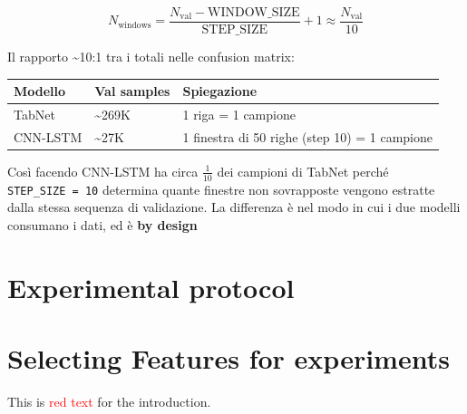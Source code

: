 \[N_{\text{windows}} = \frac{N_{\text{val}} - \text{WINDOW\_SIZE}}{\text{STEP\_SIZE}} + 1 \approx \frac{N_{\text{val}}}{10}\]

Il rapporto \textasciitilde10:1 tra i totali nelle confusion matrix:

{\def\LTcaptype{none} %
\begin{longtable}[]{@{}lll@{}}
\toprule\noalign{}
Modello & Val samples & Spiegazione \\
\midrule\noalign{}
\endhead
\bottomrule\noalign{}
\endlastfoot
TabNet & \textasciitilde269K & 1 riga = 1 campione \\
CNN-LSTM & \textasciitilde27K & 1 finestra di 50 righe (step 10) = 1 campione \\
\end{longtable}
}

Così facendo CNN-LSTM ha circa \(\frac{1}{10}\) dei campioni di TabNet perché \texttt{STEP\_SIZE\ =\ 10} determina quante finestre non sovrapposte vengono estratte dalla stessa sequenza di validazione.
La differenza è nel modo in cui i due modelli consumano i dati, ed è \textbf{by design}




\newpage
\section{Experimental protocol}
\label{Chap: model selection}



\newpage
\section{Selecting Features for experiments}
\label{Chap: model selection}



This is \textcolor{red}{red text} for the introduction.



